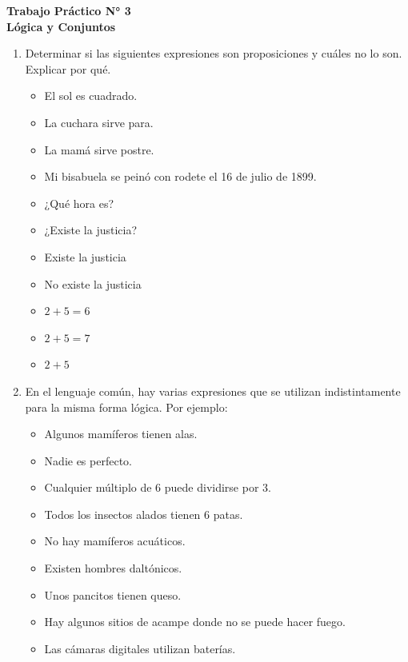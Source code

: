 \documentclass[12pt]{article}
\theoremstyle{definition}
\theoremstyle{remark}
\begin{document}
\fancyhf{}
\pagestyle{fancy}


\begin{centering}
\Large{\textbf{Trabajo Práctico N° 3}}\\
\large{\textbf{Lógica y Conjuntos}}\\
\end{centering}
\begin{enumerate}
\item Determinar si las siguientes expresiones son proposiciones y cuáles no lo son. Explicar por qué.
\begin{multicols}{2}
 \begin{itemize}
 \setlength\itemsep{0em}
        \item El sol es cuadrado.
        \item La cuchara sirve para.
        \item La mamá sirve postre.
        \item Mi bisabuela se peinó con rodete el 16 de julio de 1899.
        \item ¿Qué hora es?
        \item ¿Existe la justicia?
        \item Existe la justicia
        \item No existe la justicia
        \item $2 + 5 = 6$
        \item $2 + 5 = 7$
        \item$2 + 5 $
  \end{itemize}
\end{multicols}

\item En el lenguaje común, hay varias expresiones que se utilizan indistintamente para la misma forma lógica.  Por ejemplo:
 \begin{multicols}{2}
 \begin{itemize}
 \setlength\itemsep{0em}
    \item Algunos mamíferos tienen alas. 
   	\item Nadie es perfecto.
	\item Cualquier  múltiplo de 6 puede dividirse por 3. 
	\item Todos los insectos alados tienen 6 patas. 
	\item No hay mamíferos acuáticos. 
	\item Existen hombres daltónicos.
	\item Unos pancitos tienen queso. 
	\item Hay algunos sitios de acampe donde no se puede hacer fuego.
	\item Las cámaras digitales utilizan baterías.
  \end{itemize}
\end{multicols}


\end{enumerate}
\end{document}
